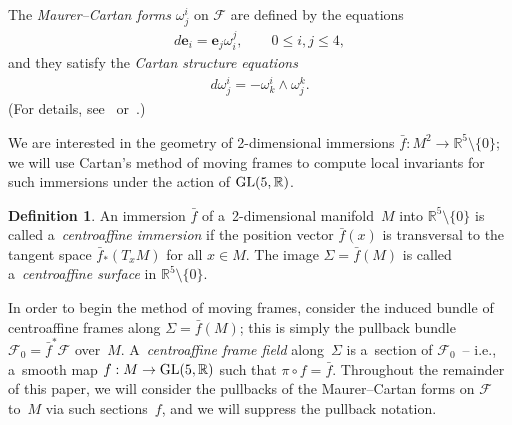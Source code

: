 \documentclass[10pt,a4paper]{amsart}
\numberwithin{equation}{section}
\theoremstyle{definition}
\newtheorem{dfn}[teo]{Definition}
\begin{document}
The {\em Maurer--Cartan forms} $\omega^i_j$ on $\mathcal{F}$ are def\/ined by the equations
\begin{gather}
d\mathbf{e}_{i} = \mathbf{e}_{j}  \omega^{j}_{i},
\qquad
0 \leq i,j \leq 4,
\label{define-MC-forms}
\end{gather}
and they satisfy the {\em Cartan structure equations}
\begin{gather}
d\omega^i_j = -\omega^i_k \wedge \omega^k_j.
\label{structure-eqns}
\end{gather}
(For details, see~\cite[p.~18]{CFB} or~\cite{FTC}.)

We are interested in the geometry of 2-dimensional immersions $\bar{f}:M^2 \to \mathbb{R}^5 \setminus \{0\}$; we will
use Cartan's method of moving frames to compute local invariants for such immersions under the action of ${\rm
GL}(5,\mathbb{R})$.

\begin{dfn}
\label{centroaffine-immersion-def}
An immersion $\bar{f}$ of a~2-dimensional manifold~$M$ into $\mathbb{R}^5 \setminus \{0\}$ is called a~{\em centroaffine
immersion} if the position vector $\bar{f}(x)$ is transversal to the tangent space $\bar{f}_*(T_xM)$ for all $x\in M$.
The image $\Sigma = \bar{f}(M)$ is called a~{\em centroaffine surface} in $\mathbb{R}^5 \setminus \{0\}$.
\end{dfn}

In order to begin the method of moving frames, consider the induced bundle of centroaf\/f\/ine frames along $\Sigma =
\bar{f}(M)$; this is simply the pullback bundle $\mathcal{F}_0 = \bar{f}^*\mathcal{F}$ over~$M$.
A~{\em centroaffine frame field} along~$\Sigma$ is a~section of $\mathcal{F}_0$~-- i.e., a~smooth map $f:M \to {\rm
GL}(5,\mathbb{R})$ such that $\pi \circ f = \bar{f}$. Throughout the remainder of this paper, we will consider the
pullbacks of the Maurer--Cartan forms on $\mathcal{F}$ to~$M$ via such sections~$f$, and we will suppress the pullback
notation.
\end{document}
